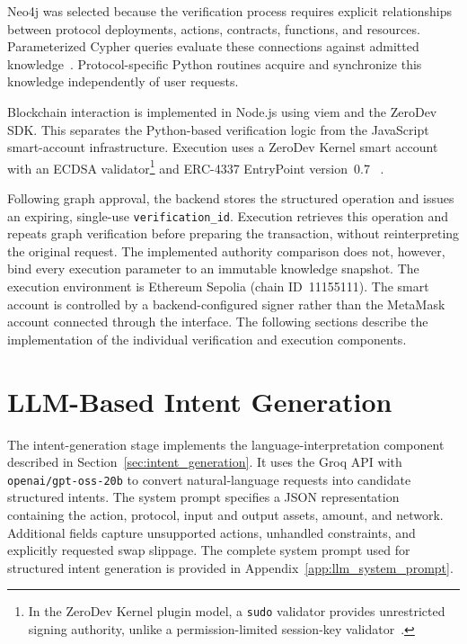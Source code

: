 Neo4j was selected because the verification process
requires explicit relationships between protocol
deployments, actions, contracts, functions, and resources.
Parameterized Cypher queries evaluate these connections
against admitted knowledge~\cite{implNeo4jCypher}.
Protocol-specific Python routines acquire and synchronize
this knowledge independently of user requests.

Blockchain interaction is implemented in Node.js using
viem and the ZeroDev SDK. This separates the Python-based
verification logic from the JavaScript smart-account
infrastructure. Execution uses a ZeroDev Kernel smart
account with an ECDSA validator\footnote{In the ZeroDev
Kernel plugin model, a \texttt{sudo} validator provides
unrestricted signing authority, unlike a permission-limited
session-key validator~\cite{implZeroDevPlugins}.}
and ERC-4337 EntryPoint version~0.7
~\cite{implZeroDevSDK,implERC4337}.

Following graph approval, the backend stores the structured
operation and issues an expiring, single-use
\texttt{verification\_id}. Execution retrieves this
operation and repeats graph verification before preparing
the transaction, without reinterpreting the original
request. The implemented authority comparison does not,
however, bind every execution parameter to an immutable
knowledge snapshot. The execution environment is Ethereum Sepolia
(chain ID~11155111). The smart account is controlled by
a backend-configured signer rather than the MetaMask
account connected through the interface. The following
sections describe the implementation of the individual
verification and execution components.



\section{LLM-Based Intent Generation}
\label{sec:llm_intent_generation}

The intent-generation stage implements the language-interpretation
component described in Section~\ref{sec:intent_generation}.
It uses the Groq API with \texttt{openai/gpt-oss-20b} to
convert natural-language requests into candidate structured
intents. The system prompt specifies a JSON representation
containing the action, protocol, input and output assets,
amount, and network. Additional fields capture unsupported
actions, unhandled constraints, and explicitly requested
swap slippage. The complete system prompt used for structured intent
generation is provided in Appendix~\ref{app:llm_system_prompt}.

